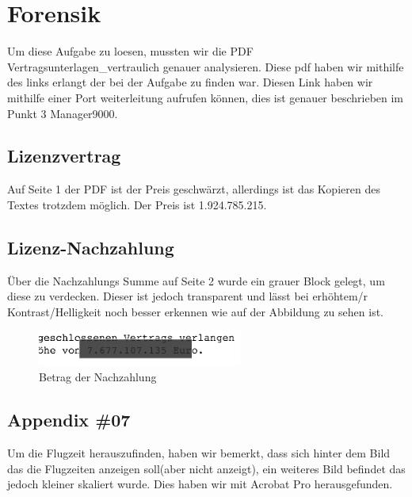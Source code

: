 \documentclass[12pt,a4paper,titlepage,oneside]{scrartcl}
\begin{document}
\maketitle
\setcounter{section}{0}
\setcounter{tocdepth}{2}
\tableofcontents

%
%

\pagebreak
\section{Forensik}
Um diese Aufgabe zu loesen, mussten wir die PDF Vertragsunterlagen\_vertraulich genauer analysieren.
Diese pdf haben wir mithilfe des links erlangt der bei der Aufgabe zu finden war. 
Diesen Link haben wir mithilfe einer Port weiterleitung aufrufen können, dies ist genauer beschrieben im Punkt 3 Manager9000.

\subsection{Lizenzvertrag}
Auf Seite 1 der PDF ist der Preis geschwärzt, allerdings ist das Kopieren des Textes trotzdem möglich. Der Preis ist 1.924.785.215.



\subsection{Lizenz-Nachzahlung}

Über die Nachzahlungs Summe auf Seite 2 wurde ein grauer Block gelegt, um diese zu verdecken.
Dieser ist jedoch transparent und lässt bei erhöhtem/r Kontrast/Helligkeit noch besser erkennen
 wie auf der Abbildung zu sehen ist.

\begin{figure}[h!]
  \centering
    \includegraphics[width=0.6\textwidth]{./imgs/Forensik/Lizenz_Nachzahlung.png}
  \caption{Betrag der Nachzahlung}
  \label{fig:nachz}
\end{figure}

\subsection{Appendix \#07}
Um die Flugzeit herauszufinden, haben wir bemerkt, dass sich hinter dem Bild das die Flugzeiten anzeigen soll(aber nicht anzeigt), ein weiteres Bild befindet das jedoch kleiner skaliert wurde.
Dies haben wir mit Acrobat Pro herausgefunden.
\end{document}
